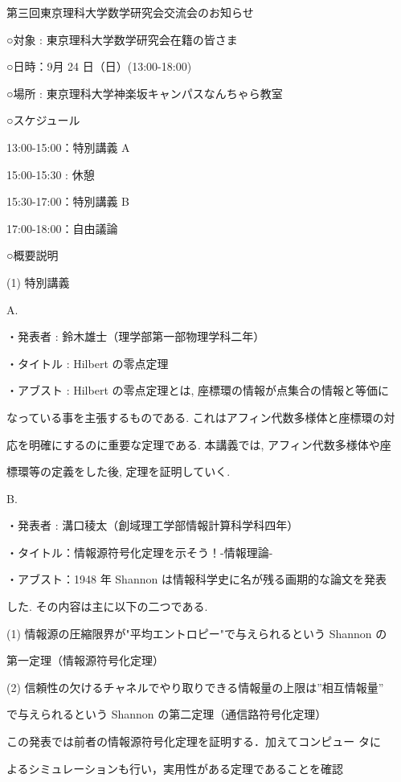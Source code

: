 \documentclass[10pt]{article}
\begin{document}
\begin{center}
第三回東京理科大学数学研究会交流会のお知らせ
\end{center}

○対象 : 東京理科大学数学研究会在籍の皆さま

\bigskip

○日時：9月 24 日（日）(13:00-18:00)

\bigskip

○場所 : 東京理科大学神楽坂キャンパスなんちゃら教室

\bigskip

○スケジュール

13:00-15:00：特別講義 A

15:00-15:30 : 休憩

15:30-17:00：特別講義 B

17:00-18:00：自由議論

\bigskip

○概要説明

(1) 特別講義

A.

・発表者 : 鈴木雄士（理学部第一部物理学科二年）

・タイトル : Hilbert の零点定理

・アブスト : Hilbert の零点定理とは, 座標環の情報が点集合の情報と等価に

なっている事を主張するものである. これはアフィン代数多様体と座標環の対

応を明確にするのに重要な定理である. 本講義では, アフィン代数多様体や座

標環等の定義をした後, 定理を証明していく.

\bigskip

B.

・発表者 : 溝口稜太（創域理工学部情報計算科学科四年）

・タイトル：情報源符号化定理を示そう！-情報理論-

・アブスト：1948 年 Shannon は情報科学史に名が残る画期的な論文を発表

した. その内容は主に以下の二つである.

(1) 情報源の圧縮限界が"平均エントロピー"で与えられるという Shannon の

第一定理（情報源符号化定理）

(2) 信頼性の欠けるチャネルでやり取りできる情報量の上限は”相互情報量”

で与えられるという Shannon の第二定理（通信路符号化定理）

\quad この発表では前者の情報源符号化定理を証明する．加えてコンピュー タに

よるシミュレーションも行い，実用性がある定理であることを確認
\end{document}
